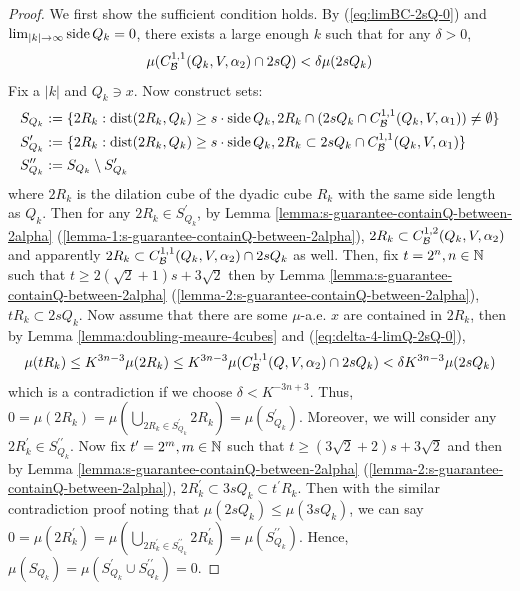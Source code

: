 \begin{proof}
    We first show the sufficient condition holds. By (\ref{eq:limBC-2sQ-0}) and $\lim_{|k|\rightarrow\infty} \operatorname{side} Q_k = 0$, there exists a large enough $k$ such that for any $\delta>0$,
    \begin{equation}\label{eq:delta-4-limQ-2sQ-0}
        \mu(C_\mathcal B^{1,1}(Q_k, V, \alpha_2)\cap 2sQ) < \delta\mu(2sQ_k)
    \end{equation}
    Fix a $|k|$ and $Q_k\ni x$. Now construct sets:
    \begin{equation*}
        \begin{split}
            S_{Q_k} &:= \{2R_k: \operatorname{dist}(2R_k, Q_k)\geq s\cdot\operatorname{side} Q_k, 2R_k\cap(2sQ_k\cap C_\mathcal B^{1, 1} (Q_k, V, \alpha_1))\neq \emptyset\} \\
            S_{Q_k}^\prime &:= \{2R_k: \operatorname{dist}(2R_k, Q_k)\geq s\cdot\operatorname{side} Q_k, 2R_k\subset 2sQ_k\cap C_\mathcal B^{1, 1} (Q_k, V, \alpha_1)\} \\
            S_{Q_k}^{\prime\prime} &:= S_{Q_k} \setminus S_{Q_k}^\prime
        \end{split}
    \end{equation*}
    where $2R_k$ is the dilation cube of the dyadic cube $R_k$ with the same side length as $Q_k$. Then for any $2R_k\in S_{Q_k}^\prime$, by Lemma \ref{lemma:s-guarantee-containQ-between-2alpha} (\ref{lemma-1:s-guarantee-containQ-between-2alpha}), $2R_k\subset  C_\mathcal B^{1,2}(Q_k, V, \alpha_2)$ and apparently $2R_k\subset  C_\mathcal B^{1,1}(Q_k, V, \alpha_2)\cap 2sQ_k$ as well. Then, fix $t=2^n, n\in\mathbb{N}$ such that $t\geq 2(\sqrt{2}+1)s + 3\sqrt{2}$ then by Lemma \ref{lemma:s-guarantee-containQ-between-2alpha} (\ref{lemma-2:s-guarantee-containQ-between-2alpha}), $tR_k\subset 2sQ_k$. Now assume that there are some $\mu$-a.e. $x$ are contained in $2R_k$, then by Lemma \ref{lemma:doubling-meaure-4cubes} and (\ref{eq:delta-4-limQ-2sQ-0}), 
    \begin{equation*}
        \mu(tR_k)\leq K^{3n-3}\mu(2R_k)\leq K^{3n-3}\mu(C_\mathcal B^{1,1}(Q, V, \alpha_2)\cap 2sQ_k) < \delta K^{3n-3} \mu(2sQ_k)
    \end{equation*}
    which is a contradiction if we choose $\delta<K^{-3n+3}$. Thus, $0=\mu(2R_k) = \mu(\bigcup_{2R_k\in S_{Q_k}^\prime} 2R_k) = \mu(S_{Q_k}^\prime)$. Moreover, we will consider any $2R_k^\prime\in S^{\prime\prime}_{Q_k}$. Now fix $t^\prime = 2^m, m\in\mathbb{N}$ such that $t\geq (3\sqrt{2}+2)s + 3\sqrt{2}$ and then by Lemma \ref{lemma:s-guarantee-containQ-between-2alpha} (\ref{lemma-2:s-guarantee-containQ-between-2alpha}), $2R_k^\prime \subset  3sQ_k \subset t^\prime R_k$. Then with the similar contradiction proof noting that $\mu(2sQ_k)\leq \mu(3sQ_k)$, we can say $0=\mu(2R_k^\prime) = \mu(\bigcup_{2R_k^\prime\in S_{Q_k}^{\prime\prime}} 2R_k^\prime) = \mu(S_{Q_k}^{\prime\prime})$. Hence, $\mu(S_{Q_k}) = \mu(S_{Q_k}^\prime \cup S_{Q_k}^{\prime\prime}) = 0$. 
    

\end{proof}
